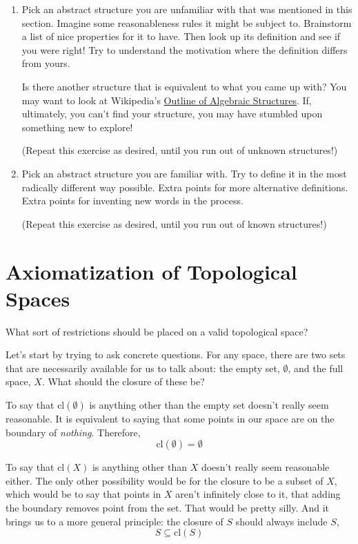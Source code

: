 \documentclass{report}
\newcommand{\cl}{\mathrm{cl}}
\begin{document}
\begin{enumerate}

\item Pick an abstract structure you are unfamiliar with that was mentioned in this section. Imagine some reasonableness rules it might be subject to. Brainstorm a list of nice properties for it to have. Then look up its definition and see if you were right! Try to understand the motivation where the definition differs from yours.

Is there another structure that is equivalent to what you came up with? You may want to look at Wikipedia's \href{http://en.wikipedia.org/wiki/Outline_of_algebraic_structures}{Outline of Algebraic Structures}. If, ultimately, you can't find your structure, you may have stumbled upon something new to explore!

(Repeat this exercise as desired, until you run out of unknown structures!)

\item Pick an abstract structure you are familiar with. Try to define it in the most radically different way possible. Extra points for more alternative definitions. Extra points for inventing new words in the process.

(Repeat this exercise as desired, until you run out of known structures!)

\end{enumerate}

\section{Axiomatization of Topological Spaces}

What sort of restrictions should be placed on a valid topological space?

Let's start by trying to ask concrete questions. For any space, there are two sets that are necessarily available for us to talk about: the empty set, $∅$, and the full space, $X$. What should the closure of these be?

To say that $\cl(∅)$ is anything other than the empty set doesn't really seem reasonable. It is equivalent to saying that some points in our space are on the boundary of \emph{nothing}. Therefore, 
\begin{equation}
\cl(∅) = ∅ \tag{Closure 1}
\end{equation}

To say that $\cl(X)$ is anything other than $X$ doesn't really seem reasonable either. The only other possibility would be for the closure to be a subset of $X$, which would be to say that points in $X$ aren't infinitely close to it, that adding the boundary removes point from the set. That would be pretty silly. And it brings us to a more general principle: the closure of $S$ should always include $S$,
\begin{equation}
S ⊆ \cl(S) \tag{Closure 2}
\end{equation}
\end{document}
